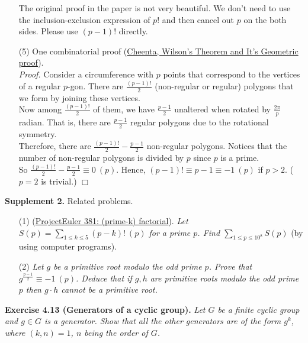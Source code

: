 \documentclass{article}
\begin{document}
\begin{enumerate}
The original proof in the paper is not very beautiful.
We don't need to use the inclusion-exclusion expression of $p!$
and then cancel out $p$ on the both sides. Please use $(p - 1)!$ directly.
\item[(5)]
One combinatorial proof
(\href{https://www.youtube.com/watch?v=4qbh7mC6YCY}
{Cheenta, Wilson's Theorem and It's Geometric proof}). \\
\emph{Proof.}
Consider a circumference with $p$ points that correspond to the vertices of a regular $p$-gon.
There are $\frac{(p - 1)!}{2}$ (non-regular or regular) polygons
that we form by joining these vertices. \\

Now among $\frac{(p - 1)!}{2}$ of them, we have $\frac{p - 1}{2}$ unaltered
when rotated by $\frac{2 \pi}{p}$ radian.
That is, there are $\frac{p - 1}{2}$ regular polygons due to the rotational symmetry. \\

Therefore, there are $\frac{(p - 1)!}{2} - \frac{p - 1}{2}$ non-regular polygons.
Notices that the number of non-regular polygons is divided by $p$ since $p$ is a prime. \\

So $\frac{(p - 1)!}{2} - \frac{p - 1}{2} \equiv 0 \: (p)$.
Hence, $(p - 1)! \equiv p - 1 \equiv -1 \: (p)$ if $p > 2$. ($p = 2$ is trivial.)
$\Box$ \\

\end{enumerate}

\textbf{Supplement 2.} Related problems.
\begin{enumerate}
\item[(1)]
(\href{https://projecteuler.net/problem=381}
{ProjectEuler 381: (prime-k) factorial}).
\emph{Let $S(p) = \sum_{1 \leq k \leq 5}(p-k)! \: (p)$ for a prime $p$.
Find $\sum_{1 \leq p \leq {10}^8} S(p)$} (by using computer programs).
\item[(2)]
\emph{Let $g$ be a primitive root modulo the odd prime $p$.
Prove that $g^{\frac{p - 1}{2}} \equiv -1 \: (p)$.
Deduce that if $g, h$ are primitive roots modulo the odd prime $p$
then $g \cdot h$ cannot be a primitive root.} \\
\end{enumerate}



\textbf{Exercise 4.13 (Generators of a cyclic group).}
\emph{Let $G$ be a finite cyclic group and $g \in G$ is a generator.
Show that all the other generators are of the form $g^k$,
where $(k, n) = 1$, $n$ being the order of $G$.} \\
\end{document}
